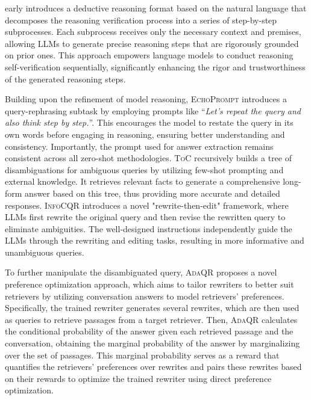 \documentclass[11pt]{article}
\begin{document}
\citet{Natural-Program} early introduces a deductive reasoning format based on the natural language that decomposes the reasoning verification process into a series of step-by-step subprocesses. Each subprocess receives only the necessary context and premises, allowing LLMs to generate precise reasoning steps that are rigorously grounded on prior ones. This approach empowers language models to conduct reasoning self-verification sequentially, significantly enhancing the rigor and trustworthiness of the generated reasoning steps.

Building upon the refinement of model reasoning, \textsc{EchoPrompt} \cite{EchoPrompt} introduces a query-rephrasing subtask by employing prompts like “\textit{Let’s repeat the query and also think step by step.}”. This encourages the model to restate the query in its own words before engaging in reasoning, ensuring better understanding and consistency. Importantly, the prompt used for answer extraction remains consistent across all zero-shot methodologies.
\textsc{ToC} \cite{ToC} recursively builds a tree of disambiguations for ambiguous queries by utilizing few-shot prompting and external knowledge. It retrieves relevant facts to generate a comprehensive long-form answer based on this tree, thus providing more accurate and detailed responses.
\textsc{InfoCQR} \cite{InfoCQR} introduces a novel "rewrite-then-edit" framework, where LLMs first rewrite the original query and then revise the rewritten query to eliminate ambiguities. The well-designed instructions independently guide the LLMs through the rewriting and editing tasks, resulting in more informative and unambiguous queries.

To further manipulate the disambiguated query, \textsc{AdaQR} \cite{AdaQR} proposes a novel preference optimization approach, which aims to tailor rewriters to better suit retrievers by utilizing conversation answers to model retrievers’ preferences. Specifically, the trained rewriter generates several rewrites, which are then used as queries to retrieve passages from a target retriever. Then, \textsc{AdaQR} calculates the conditional probability of the answer given each retrieved passage and the conversation, obtaining the marginal probability of the answer by marginalizing over the set of passages. This marginal probability serves as a reward that quantifies the retrievers’ preferences over rewrites and pairs these rewrites based on their rewards to optimize the trained rewriter using direct preference optimization.
\end{document}
